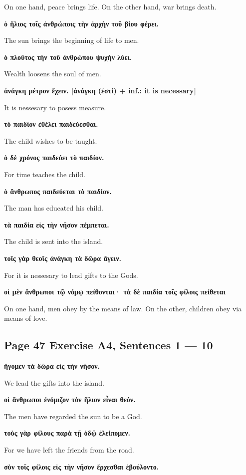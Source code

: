 On one hand, peace brings life. On the other hand, war brings death.

\noindent\textbf{ὁ ἥλιος τοῖς ἀνθρώποις τὴν ἀρχὴν τοῦ βίου φέρει.}

The sun brings the beginning of life to men.

\noindent\textbf{ὁ πλοῦτος τὴν τοῦ ἀνθρώπου ψυχὴν λύει.}

Wealth loosens the soul of men.

\noindent\textbf{ἀνάγκη μέτρον ἔχειν. [ἀνάγκη (ἐστί) + inf.: it is necessary]}

It is nessesary to posess measure.

\noindent\textbf{τὸ παιδίον ἐθέλει παιδεύεσθαι.}

The child wishes to be taught.

\noindent\textbf{ὁ δὲ χρόνος παιδεύει τὸ παιδίον.}

For time teaches the child.

\noindent\textbf{ὁ ἄνθρωπος παιδεύεται τὸ παιδίον.}

The man has educated his child.

\noindent\textbf{τὰ παιδία εἰς τὴν νῆσον πέμπεται.}

The child is sent into the island.

\noindent\textbf{τοῖς γὰρ θεοῖς ἀνάγκη τὰ δῶρα ἄγειν.}

For it is nessesary to lead gifts to the Gods.

\noindent\textbf{οἱ μὲν ἄνθρωποι τῷ νόμῳ πείθονται· τὰ δὲ παιδία τοῖς φίλοις πείθεται}

On one hand, men obey by the means of law. On the other, children obey via means of love.

\subsection*{Page 47 Exercise A4, Sentences 1 --- 10}
\noindent\textbf{ἤγομεν τὰ δῶρα εἰς τὴν νῆσον.}

We lead the gifts into the island.

\noindent\textbf{οἱ ἄνθρωποι ἐνόμιζον τὸν ἥλιον εἶναι θεόν.}

The men have regarded the sun to be a God.

\noindent\textbf{τοὺς γὰρ φίλους παρὰ τῇ ὁδῷ ἐλείπομεν.}

For we have left the friends from the road.

\noindent\textbf{σὺν τοῖς φίλοις εἰς τὴν νῆσον ἔρχεσθαι ἐβούλοντο.}

